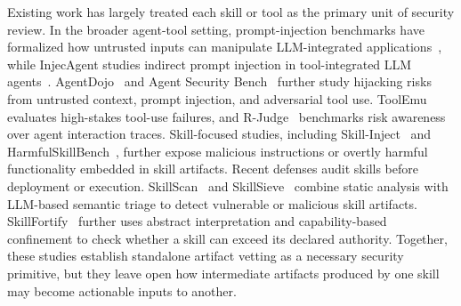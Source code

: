 \documentclass{article}
\begin{document}

Existing work has largely treated each skill or tool as the primary unit of security review. In the broader agent-tool setting, prompt-injection benchmarks have formalized how untrusted inputs can manipulate LLM-integrated applications~\citep{liu2024formalizing}, while InjecAgent studies indirect prompt injection in tool-integrated LLM agents~\citep{zhan2024injecagent}. AgentDojo~\citep{debenedetti2024agentdojo} and Agent Security Bench~\citep{zhang2025agent} further study hijacking risks from untrusted context, prompt injection, and adversarial tool use. ToolEmu~\citep{ruan2024toolemu} evaluates high-stakes tool-use failures, and R-Judge~\citep{yuan2024rjudge} benchmarks risk awareness over agent interaction traces. Skill-focused studies, including Skill-Inject~\citep{schmotz2026skillinject} and HarmfulSkillBench~\citep{jiang2026harmfulskillbench}, further expose malicious instructions or overtly harmful functionality embedded in skill artifacts. Recent defenses audit skills before deployment or execution. SkillScan~\citep{liu2026donotmentionmaliciousskills} and SkillSieve~\citep{hou2026skillsieve} combine static analysis with LLM-based semantic triage to detect vulnerable or malicious skill artifacts. SkillFortify~\citep{bhardwaj2026formalanalysis} further uses abstract interpretation and capability-based confinement to check whether a skill can exceed its declared authority. Together, these studies establish standalone artifact vetting as a necessary security primitive, but they leave open how intermediate artifacts produced by one skill may become actionable inputs to another.
\end{document}
